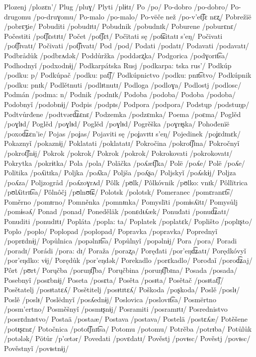 Plozenj /plozɛn’/
Plug /pluɣ/
Plyti /plɨtɪ/
Po /po/
Po-dobro /po-dobro/
Po-drugomu /po-druɣomu/
Po-malo /po-malo/
Po-vëče než /po-v’et͡ʃɛ nɛʐ/
Pobrežïë /pobrɛʒie/
Pobuditi /pobudɪtɪ/
Pobudnik /pobudnɪk/
Poburene /poburɛnɛ/
Počestiti /pot͡ʃɛstɪtɪ/
Počet /pot͡ʃɛt/
Počïtati sę /pot͡ɕitatɪ s’eŋ/
Počivati /pot͡ʃɪvatɪ/
Počivati /pot͡ʃɪvatɪ/
Pod /pod/
Podati /podatɪ/
Podavati /podavatɪ/
Podbrådůk /podbrʌdək/
Poddůržka /poddərʐka/
Podgorica /podɣorɪt͡sa/
Podhodnyǐ /podxodnɨj/
Podkarpátska Rusj /podkarpa: tska rus’/
Podkúp /podku: p/
Podkúpač /podku: pat͡ʃ/
Podkúpnictvo /podku: pnɪt͡stvo/
Podkúpnik /podku: pnɪk/
Podlětnuti /podlᵻtnutɪ/
Podloga /podloɣa/
Podlostj /podlosc/
Podmán /podma: n/
Podnik /podnɪk/
Podoba /podoba/
Podoba /podoba/
Podobnyǐ /podobnɨj/
Podpis /podpɪs/
Podpora /podpora/
Podstųp /podstuŋp/
Podtvůrđene /podtvərd͡ʑɛnɛ/
Podzemka /podzɛmka/
Poema /poɛma/
Poglěd /poɣlᵻd/
Poglěd /poɣlᵻd/
Poglěd /poɣlᵻd/
Pogrěška /poɣrᵻʂka/
Pohođenïë /poxod͡ʑɛn’ie/
Pojas /poʝas/
Pojaviti sę /poʝavɪtɪ s’eŋ/
Pojedinek /poʝɛdɪnɛk/
Pokaznyǐ /pokaznɨj/
Poklatati /poklatatɪ/
Pokročina /pokrot͡ʃɪna/
Pokročnyǐ /pokrot͡ʃnɨj/
Pokrok /pokrok/
Pokrok /pokrok/
Pokrokovati /pokrokovatɪ/
Pokrytka /pokrɨtka/
Pola /pola/
Poläčka /poʎæt͡ʃka/
Polë /poʎe/
Polë /poʎe/
Polïtika /poʎitɪka/
Poljka /poʎka/
Poljša /poʎʂa/
Poljskyǐ /poʎskɨj/
Poljza /poʎza/
Poljzogråd /poʎzoɣrʌd/
Pôlk /pʊlk/
Pôlkóvnik /pʊlko: vnɪk/
Pôllïtrica /pʊlʎitrɪt͡sa/
Pôlnôčj /pʊlnʊt͡ɕ/
Polotsk /polotsk/
Pomeranec /pomɛranɛt͡s/
Poměrno /pomᵻrno/
Pomněnka /pomnᵻnka/
Pomyslïti /pomɨsʎitɪ/
Pomysůlj /pomɨsəʎ/
Ponad /ponad/
Poneděläk /ponɛdᵻʎæk/
Ponuđati /ponud͡ʑatɪ/
Ponuditi /ponudɪtɪ/
Popláta /popla: ta/
Poplatek /poplatɛk/
Poplišto /poplɪʂto/
Poplo /poplo/
Poplopad /poplopad/
Popravka /popravka/
Poprednyǐ /poprɛdnɨj/
Popůlnica /popəlnɪt͡sa/
Popůlnyǐ /popəlnɨj/
Pora /pora/
Poradi /poradɪ/
Porádi /pora: dɪ/
Poraža /poraʐa/
Poręđati /por’eŋd͡ʑatɪ/
Porędkóvyǐ /por’eŋdko: vɨj/
Porędůk /por’eŋdək/
Porekadlo /porɛkadlo/
Porođaǐ /porod͡ʑaj/
Pôrt /pʊrt/
Porųčba /poruŋt͡ʃba/
Porųčbina /poruŋt͡ʃbɪna/
Posada /posada/
Posebnyǐ /posɛbnɨj/
Poseta /posɛta/
Posěta /posᵻta/
Posětač /posᵻtat͡ʃ/
Posětatelj /posᵻtatɛʎ/
Posětitelj /posᵻtɪtɛʎ/
Poškoda /poʂkoda/
Poslě /poslᵻ/
Poslě /poslᵻ/
Poslëdnyǐ /posʎednɨj/
Poslovica /poslovɪt͡sa/
Posmërtno /posm’ertno/
Posměšnyǐ /posmᵻʂnɨj/
Posramiti /posramɪtɪ/
Posrednistvo /posrɛdnɪstvo/
Postaä /postaæ/
Postava /postava/
Postelä /postɛʎæ/
Potěšene /potᵻʂɛnɛ/
Potočnica /potot͡ʃnɪt͡sa/
Potomu /potomu/
Potrěba /potrᵻba/
Potůlůk /potələk/
Pötůr /p’œtər/
Povedati /povɛdatɪ/
Pověstj /povᵻsc/
Pověstj /povᵻsc/
Pověstnyǐ /povᵻstnɨj/
